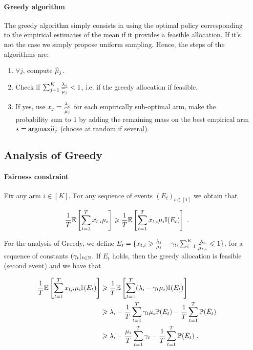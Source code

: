 \paragraph{Greedy algorithm} The greedy algorithm simply consists in using the optimal policy corresponding to the empirical estimates of the mean if it provides a feasible allocation. If it's not the case we simply propose uniform sampling. Hence, the steps of the algorithms are: 
\begin{enumerate}
	\item $\forall j$, compute $\widehat{\mu}_j$.
	\item Check if $\sum_{j=1}^K \frac{\lambda_j}{\widehat{\mu}_j}<1$, i.e. if the greedy allocation if feasible.
	\item If yes, use $x_j=\frac{\lambda_j}{\widehat{\mu}_j}$ for each empirically sub-optimal arm, make the probability sum to $1$ by adding the remaining mass on the best empirical arm $\star = \text{argmax} \widehat{\mu}_j$ (choose at random if several).
\end{enumerate}


\subsection{Analysis of Greedy}

\paragraph{Fairness constraint} Fix any arm $i \in [K]$. For any sequence of events $(E_t)_{t\in[T]}$ we obtain that 

\begin{align*} 
\frac{1}{T} \mathbb{E}\left[\sum_{t=1}^T x_{t,i} \mu_i \right] \geqslant 
\frac{1}{T} \mathbb{E}\left[\sum_{t=1}^T x_{t,i} \mu_i \mathbb{I}(E_t) \right]\;.
\end{align*}

For the analysis of Greedy, we define $E_t = \{x_{t,i} \geqslant \frac{\lambda_i}{\mu_i}-\gamma_t, \sum_{i=1}^K \frac{\lambda_i}{\widehat{\mu}_{t, i}}\leqslant 1 \}$, for a sequence of constants $(\gamma_t)_{t \in \mathbb{N}}$. If $E_t$ holds, then the greedy allocation is feasible (second event) and we have that 

\begin{align*}  
\frac{1}{T} \mathbb{E}\left[\sum_{t=1}^T x_{t,i} \mu_i \mathbb{I}(E_t) \right] &\geqslant \frac{1}{T} \mathbb{E}\left[\sum_{t=1}^T (\lambda_i - \gamma_t \mu_i) \mathbb{I}(E_t) \right] \\
& \geqslant  \lambda_i - \frac{1}{T} \sum_{t=1}^T \gamma_t \mu_i \mathbb{P}(E_t) - \frac{1}{T} \sum_{t=1}^T \mathbb{P}(\bar E_t) \\
& \geqslant  \lambda_i - \frac{\mu_i}{T} \sum_{t=1}^T \gamma_t - \frac{1}{T} \sum_{t=1}^T  \mathbb{P}(\bar E_t)\;.
\end{align*}

